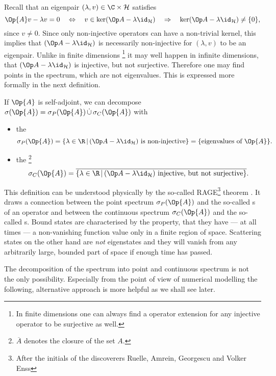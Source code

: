 Recall that an eigenpair $(\lambda, v) \in \C \times \hilbert$ satisfies
\[ \Op{A} v - \lambda v = 0 \quad \Leftrightarrow \quad v \in \ker \shiftop \quad \Rightarrow \quad \ker \shiftop \neq \{0\}, \]
since $v \neq 0$.
Since only non-injective operators can have a non-trivial kernel,
this implies that $\shiftop$ is necessarily non-injective
for $(\lambda, v)$ to be an eigenpair.
Unlike in finite dimensions%
\footnote{In finite dimensions one can always find a operator extension for any
injective operator to be surjective as well.}
it may well happen in infinite dimensions, that $\shiftop$ is injective,
but not surjective.
Therefore one may find points in the spectrum, which are not eigenvalues.
This is expressed more formally in the next definition.

\begin{defn}
	If $\Op{A}$ is self-adjoint, we can decompose
	$\sigma(\Op{A}) = \sigma_P(\Op{A}) \, \dot{\cup} \, \sigma_C(\Op{A})$
	with
	\begin{itemize}
		\item the 
			\[ \sigma_P(\Op{A}) = \left\{ \lambda \in \R \, \middle|
				\, \shiftop\ \text{is non-injective} \right\}
				= \{ \text{eigenvalues of $\Op{A}$} \}.\]
		\item the %
			\footnote{$\overline{A}$ denotes the closure of the set $A$.}
			\[ \sigma_C(\Op{A}) = \overline{\left\{ \lambda \in \R \, \middle|\, \shiftop\ \text{injective, but not surjective} \right\}}.\]
	\end{itemize}
\end{defn}
This definition can be understood physically by the so-called
RAGE\footnote{After the initials of the discoverers 
Ruelle, Amrein, Georgescu and Volker Enss}
theorem
.
It draws
a connection between the point spectrum $\sigma_P(\Op{A})$
and the so-called s of an operator
and between the continuous spectrum $\sigma_C(\Op{A})$
and the so-called s.
Bound states are characterised by the property,
that they have --- at all times --- a non-vanishing function value
only in a finite region of space.
Scattering states on the other hand are \emph{not} eigenstates
and they will vanish from any arbitrarily large, bounded part of space
if enough time has passed.

The decomposition of the spectrum into point and continuous spectrum
is not the only possibility.
Especially from the point of view of numerical modelling
the following, alternative approach is more helpful
as we shall see later.

